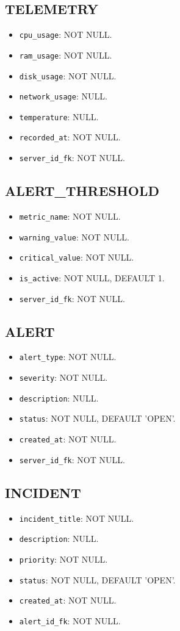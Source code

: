 \subsection{TELEMETRY}
\begin{itemize}
    \item \texttt{cpu\_usage}: NOT NULL.
    \item \texttt{ram\_usage}: NOT NULL.
    \item \texttt{disk\_usage}: NOT NULL.
    \item \texttt{network\_usage}: NULL.
    \item \texttt{temperature}: NULL.
    \item \texttt{recorded\_at}: NOT NULL.
    \item \texttt{server\_id\_fk}: NOT NULL.
\end{itemize}

\subsection{ALERT\_THRESHOLD}
\begin{itemize}
    \item \texttt{metric\_name}: NOT NULL.
    \item \texttt{warning\_value}: NOT NULL.
    \item \texttt{critical\_value}: NOT NULL.
    \item \texttt{is\_active}: NOT NULL, DEFAULT 1.
    \item \texttt{server\_id\_fk}: NOT NULL.
\end{itemize}

\subsection{ALERT}
\begin{itemize}
    \item \texttt{alert\_type}: NOT NULL.
    \item \texttt{severity}: NOT NULL.
    \item \texttt{description}: NULL.
    \item \texttt{status}: NOT NULL, DEFAULT 'OPEN'.
    \item \texttt{created\_at}: NOT NULL.
    \item \texttt{server\_id\_fk}: NOT NULL.
\end{itemize}

\subsection{INCIDENT}
\begin{itemize}
    \item \texttt{incident\_title}: NOT NULL.
    \item \texttt{description}: NULL.
    \item \texttt{priority}: NOT NULL.
    \item \texttt{status}: NOT NULL, DEFAULT 'OPEN'.
    \item \texttt{created\_at}: NOT NULL.
    \item \texttt{alert\_id\_fk}: NOT NULL.
\end{itemize}

